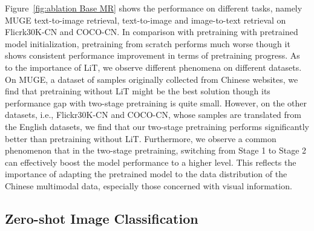 Figure~\ref{fig:ablation Base MR} shows the performance on different tasks, namely MUGE text-to-image retrieval, text-to-image and image-to-text retrieval on Flicrk30K-CN and COCO-CN. 
In comparison with pretraining with pretrained model initialization, pretraining from scratch performs much worse though it shows consistent performance improvement in terms of pretraining progress. 
As to the importance of LiT, we observe different phenomena on different datasets. On MUGE, a dataset of samples originally collected from Chinese websites, we find that pretraining without LiT might be the best solution though its performance gap with two-stage pretraining is quite small. 
However, on the other datasets, i.e., Flickr30K-CN and COCO-CN, whose samples are translated from the English datasets, we find that our two-stage pretraining performs significantly better than pretraining without LiT. 
Furthermore, we observe a common phenomenon that in the two-stage pretraining, switching from Stage 1 to Stage 2 can effectively boost the model performance to a higher level. 
This reflects the importance of adapting the pretrained model to the data distribution of the Chinese multimodal data, especially those concerned with visual information. 

\subsection{Zero-shot Image Classification}


